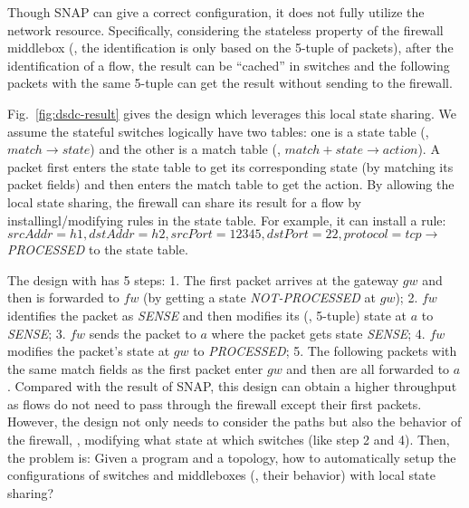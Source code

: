 Though SNAP can give a correct configuration, it does not fully utilize the
network resource. Specifically, considering the stateless property of the
firewall middlebox (\ie, the identification is only based on the 5-tuple of
packets), after the identification of a flow, the result can be ``cached'' in
switches and the following packets with the same 5-tuple can get the result
without sending to the firewall.

Fig.~\ref{fig:dsdc-result} gives the design which leverages this local state
sharing. We assume the stateful switches logically have two tables: one is a
state table (\ie, $match \rightarrow state$) and the other is a match table
(\ie, $match+state \rightarrow action$). A packet first enters the state table
to get its corresponding state (by matching its packet fields) and then enters
the match table to get the action. By allowing the local state sharing, the
firewall can share its result for a flow by installingl/modifying rules in the
state table. For example, it can install a rule:
$srcAddr=h1,dstAddr=h2,srcPort=12345,dstPort=22,protocol=tcp \rightarrow$
\emph{PROCESSED} to the state table.

The design with \concept{} has 5 steps: 1. The first packet arrives at the
gateway $gw$ and then is forwarded to $fw$ (by getting a state
\emph{NOT-PROCESSED} at $gw$); 2. $fw$ identifies the packet as \emph{SENSE} and
then modifies its (\ie, 5-tuple) state at $a$ to \emph{SENSE}; 3. $fw$ sends the
packet to $a$ where the packet gets state \emph{SENSE}; 4. $fw$ modifies the
packet's state at $gw$ to \emph{PROCESSED}; 5. The following packets with the
same match fields as the first packet enter $gw$ and then are all forwarded to
$a$. Compared with the result of SNAP, this design can obtain a higher
throughput as flows do not need to pass through the firewall except their first
packets. However, the design not only needs to consider the paths but also the
behavior of the firewall, \ie, modifying what state at which switches (like step
2 and 4). Then, the problem is: Given a program and a topology, how to
automatically setup the configurations of switches and middleboxes (\ie, their
behavior) with local state sharing?


